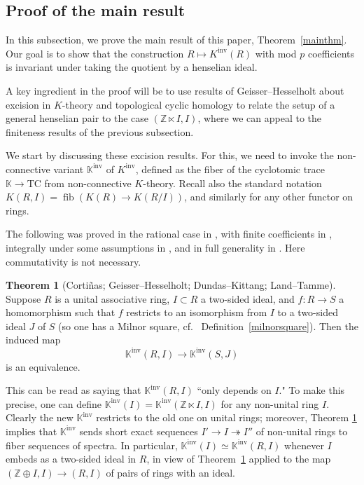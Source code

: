 \documentclass{amsart}
\newcommand{\knf}{K^{\mathrm{inv}}}
\theoremstyle{definition}
\newtheorem{theorem}[definition]{Theorem}
\newcommand{\TC}{\mathrm{TC}}
\begin{document}
\subsection{Proof of the main result}

In this subsection, we prove the main result of this paper, Theorem~\ref{mainthm}.
Our goal is to show that the construction $R \mapsto \knf(R)$ with mod $p$
coefficients is invariant under taking the quotient by a henselian ideal. 

A key ingredient in the proof will be to use results of
Geisser--Hesselholt \cite{GHexc} about excision in $K$-theory and topological
cyclic homology to relate the setup of a general henselian pair to the 
case $(\mathbb{Z} \ltimes I, I)$, where we can appeal to the finiteness results of the
previous subsection.

We start by discussing these excision results.  For this, we need to invoke the
non-connective variant $\mathbb{K}^{\operatorname{inv}}$ of
$K^{\operatorname{inv}}$, defined as the fiber of the cyclotomic trace
$\mathbb{K}\rightarrow \TC$ from non-connective $K$-theory.  Recall also the standard notation $K(R,I) = \operatorname{fib}(K(R)\rightarrow K(R/I))$, and similarly for any other functor on rings.

The following was proved in the rational case in \cite{cortinas}, with finite
coefficients in \cite{GHexc}, integrally under some assumptions
in \cite{DKexcint}, and in full generality in \cite{land-tamme}.
Here commutativity is not necessary. 

\begin{theorem}[Corti\~nas; Geisser--Hesselholt; Dundas--Kittang; Land--Tamme] 
\label{DKGHC}
Suppose $R$ is a unital associative ring, $I\subset R$ a two-sided ideal, and
$f:R\rightarrow S$ a homomorphism such that $f$ restricts to an isomorphism
from $I$ to a two-sided ideal $J$ of $S$ (so one has a Milnor square, cf.~ 
Definition~\ref{milnorsquare}).  Then the induced map
$$\mathbb{K}^{\operatorname{inv}}(R,I)\rightarrow \mathbb{K}^{\operatorname{inv}}(S,J)$$
is an equivalence.
\end{theorem} 

This can be read as saying that $\mathbb{K}^{\operatorname{inv}}(R,I)$ ``only
depends on $I$."  To make this precise, one can define
$\mathbb{K}^{\operatorname{inv}}(I) =
\mathbb{K}^{\operatorname{inv}}(\mathbb{Z}\ltimes I,I)$ for any non-unital
ring $I$.  Clearly the new $\mathbb{K}^{\operatorname{inv}}$
restricts to the old one on unital rings; moreover, Theorem  \ref{DKGHC} implies 
that $\mathbb{K}^{\operatorname{inv}}$ sends short exact sequences
$I'\rightarrow I\twoheadrightarrow I''$ of non-unital rings to fiber sequences
of spectra.  In particular, $\mathbb{K}^{\operatorname{inv}}(I) \simeq
\mathbb{K}^{\operatorname{inv}}(R,I)$ whenever $I$ embeds as a two-sided ideal
in $R$, in view of Theorem~\ref{DKGHC} applied to the map $(\mathbb{Z} \oplus I, I) \to (R, I)$ of pairs of
rings with an ideal.
\end{document}

